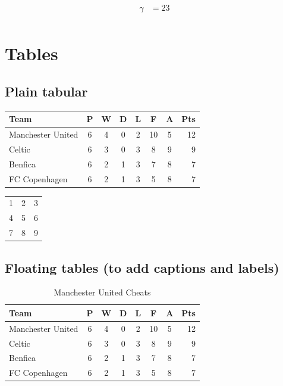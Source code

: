 \documentclass[12pt,a4paper]{article}
\begin{document}
  \begin{align}
    \gamma &= 23 \\
  \end{align}

  \section{Tables}
    \subsection{Plain tabular} 
\begin{tabular}{lccccccr}
Team              & P & W & D & L & F  & A & Pts \\
\hline
Manchester United & 6 & 4 & 0 & 2 & 10 & 5 & 12  \\
Celtic            & 6 & 3 & 0 & 3 &  8 & 9 &  9  \\
Benfica           & 6 & 2 & 1 & 3 &  7 & 8 &  7  \\
FC Copenhagen     & 6 & 2 & 1 & 3 &  5 & 8 &  7  \\
\end{tabular}

    \vspace{.5cm}

\begin{tabular}{ l | c || r }
  1 & 2 & 3 \\
  4 & 5 & 6 \\
  7 & 8 & 9 \\
\end{tabular}

    \subsection{Floating tables (to add captions and labels)}
    \begin{table}[ht!]
        \centering
        \begin{tabular}{lccccccr}
        Team              & P & W & D & L & F  & A & Pts \\
        \hline
        Manchester United & 6 & 4 & 0 & 2 & 10 & 5 & 12  \\
        Celtic            & 6 & 3 & 0 & 3 &  8 & 9 &  9  \\
        Benfica           & 6 & 2 & 1 & 3 &  7 & 8 &  7  \\
        FC Copenhagen     & 6 & 2 & 1 & 3 &  5 & 8 &  7  \\
        \end{tabular}
      \caption{Manchester United Cheats \label{tab:FCcup}}
    \end{table}
\end{document}
